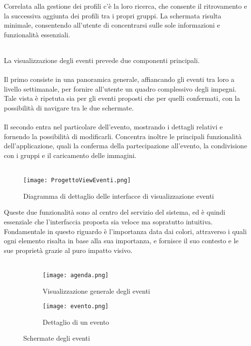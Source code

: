 Correlata alla gestione dei profili c'è la loro ricerca,
che consente il ritrovamento e la successiva aggiunta dei profili tra i propri gruppi.
La schermata risulta minimale,
consentendo all'utente di concentrarsi sulle sole informazioni e funzionalità essenziali.\\
\\



\clearpage

La visualizzazione degli eventi prevede due componenti principali.\\
\\
Il primo consiste in una panoramica generale, affiancando gli eventi tra loro a livello settimanale,
per fornire all'utente un quadro complessivo degli impegni.
Tale vista è ripetuta sia per gli eventi proposti che per quelli confermati,
con la possibilità di navigare tra le due schermate.\\
\\
Il secondo entra nel particolare dell'evento,
mostrando i dettagli relativi e fornendo la possibilità di modificarli.
Concentra inoltre le principali funzionalità dell'applicazione,
quali la conferma della partecipazione all'evento,
la condivisione con i gruppi e il caricamento delle immagini.\\
\\

\begin{figure}[h!]
    \begin{center}
        \texttt{[image: ProgettoViewEventi.png]}
        \caption{Diagramma di dettaglio delle interfacce di visualizzazione eventi}
    \end{center}
\end{figure}
\clearpage

Queste due funzionalità sono al centro del servizio del sistema,
ed è quindi essenziale che l'interfaccia proposta sia veloce ma sopratutto intuitiva.
Fondamentale in questo riguardo è l'importanza data dai colori, attraverso i quali
ogni elemento risalta in base alla sua importanza, e fornisce il suo contesto e le sue proprietà
grazie al puro impatto visivo.\\
\\



\begin{figure}[htbp]
    \centering
    \begin{subfigure}{0.49\textwidth}
        \centering
        \texttt{[image: agenda.png]}
        \caption{Visualizzazione generale degli eventi}
    \end{subfigure}
    \hfill
    \begin{subfigure}{0.49\textwidth}
        \centering
        \texttt{[image: evento.png]}
        \caption{Dettaglio di un evento}
    \end{subfigure}
    \caption{Schermate degli eventi}
\end{figure}

